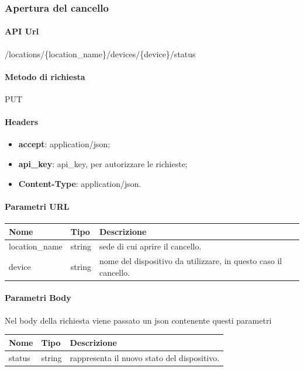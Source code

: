\subsubsection{Apertura del cancello}
\paragraph{API Url} \hfill \break
/locations/\{location\_name\}/devices/\{device\}/status
\paragraph{Metodo di richiesta } \hfill \break
PUT
\paragraph{Headers }
\begin{itemize}
    \item \textbf{accept}: application/json;
    \item \textbf{api\_key}: api\_key, per autorizzare le richieste;
    \item \textbf{Content-Type}: application/json.
\end{itemize}
\paragraph{Parametri URL} \hfill \break
\begin{center}
    \renewcommand{\arraystretch}{1.8}
    \begin{tabular}{ |m{10em}|m{4em}|m{20em}| }
        \hline
        \textbf{Nome} & \textbf{Tipo} & \textbf{Descrizione} \\
        \hline
        location\_name & string & sede di cui aprire il cancello.\\
        \hline
        device & string & nome del dispositivo da utilizzare, in questo caso il cancello.\\
        \hline
    \end{tabular}
\end{center}
\paragraph{Parametri Body} \hfill \break
Nel body della richiesta viene passato un json contenente questi parametri
\begin{center}
    \renewcommand{\arraystretch}{1.8}
    \begin{tabular}{ |m{10em}|m{4em}|m{20em}| }
        \hline
        \textbf{Nome} & \textbf{Tipo} & \textbf{Descrizione} \\
        \hline
        status & string & rappresenta il nuovo stato del dispositivo.\\
        \hline
    \end{tabular}
\end{center}

